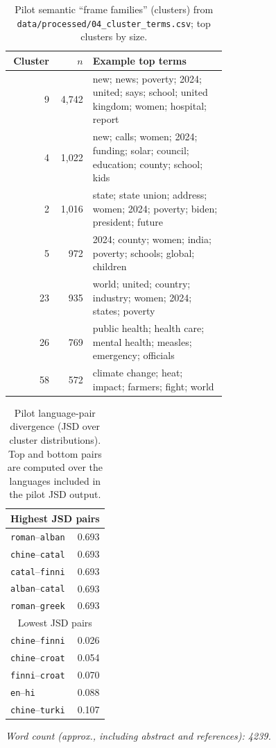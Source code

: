 \documentclass[11pt]{article}
\newcommand{\PaperWordCount}{4239}
\begin{document}
\begin{table}[H]
\centering
\caption{Pilot semantic ``frame families'' (clusters) from \texttt{data/processed/04\_cluster\_terms.csv}; top clusters by size.}
\label{tab:clusters}
\begin{tabular}{r r p{0.62\linewidth}}
\toprule
Cluster & $n$ & Example top terms \\
\midrule
9 & 4{,}742 & new; news; poverty; 2024; united; says; school; united kingdom; women; hospital; report \\
4 & 1{,}022 & new; calls; women; 2024; funding; solar; council; education; county; school; kids \\
2 & 1{,}016 & state; state union; address; women; 2024; poverty; biden; president; future \\
5 & 972 & 2024; county; women; india; poverty; schools; global; children \\
23 & 935 & world; united; country; industry; women; 2024; states; poverty \\
26 & 769 & public health; health care; mental health; measles; emergency; officials \\
58 & 572 & climate change; heat; impact; farmers; fight; world \\
\bottomrule
\end{tabular}
\end{table}

\begin{table}[H]
\centering
\caption{Pilot language-pair divergence (JSD over cluster distributions). Top and bottom pairs are computed over the languages included in the pilot JSD output.}
\label{tab:jsd_pairs}
\begin{tabular}{lr}
\toprule
\multicolumn{2}{c}{Highest JSD pairs} \\
\midrule
\texttt{roman}--\texttt{alban} & 0.693 \\
\texttt{chine}--\texttt{catal} & 0.693 \\
\texttt{catal}--\texttt{finni} & 0.693 \\
\texttt{alban}--\texttt{catal} & 0.693 \\
\texttt{roman}--\texttt{greek} & 0.693 \\
\midrule
\multicolumn{2}{c}{Lowest JSD pairs} \\
\midrule
\texttt{chine}--\texttt{finni} & 0.026 \\
\texttt{chine}--\texttt{croat} & 0.054 \\
\texttt{finni}--\texttt{croat} & 0.070 \\
\texttt{en}--\texttt{hi} & 0.088 \\
\texttt{chine}--\texttt{turki} & 0.107 \\
\bottomrule
\end{tabular}
\end{table}

\bigskip
\noindent\textit{Word count (approx., including abstract and references): \PaperWordCount.}
\end{document}
